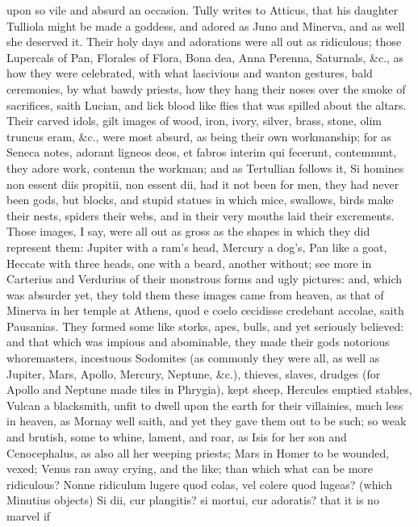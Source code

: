 {upon so vile and absurd an occasion. Tully writes to Atticus, that his
daughter Tulliola might be made a goddess, and adored as Juno and
Minerva, and as well she deserved it. Their holy days and adorations
were all out as ridiculous; those Lupercals of Pan, Florales of Flora,
Bona dea, Anna Perenna, Saturnals, \&c., as how they were celebrated,
with what lascivious and wanton gestures, bald ceremonies, by
what bawdy priests, how they hang their noses over the smoke of
sacrifices, saith Lucian, and lick blood like flies that was
spilled about the altars. Their carved idols, gilt images of wood,
iron, ivory, silver, brass, stone, olim truncus eram, \&c., were most
absurd, as being their own workmanship; for as Seneca notes, adorant
ligneos deos, et fabros interim qui fecerunt, contemnunt, they adore
work, contemn the workman; and as Tertullian follows it, Si homines non
essent diis propitii, non essent dii, had it not been for men, they had
never been gods, but blocks, and stupid statues in which mice,
swallows, birds make their nests, spiders their webs, and in their very
mouths laid their excrements. Those images, I say, were all out as
gross as the shapes in which they did represent them: Jupiter with a
ram's head, Mercury a dog's, Pan like a goat, Heccate with three heads,
one with a beard, another without; see more in Carterius and
Verdurius of their monstrous forms and ugly pictures: and, which
was absurder yet, they told them these images came from heaven, as that
of Minerva in her temple at Athens, quod e coelo cecidisse credebant
accolae, saith Pausanias. They formed some like storks, apes, bulls,
and yet seriously believed: and that which was impious and abominable,
they made their gods notorious whoremasters, incestuous Sodomites (as
commonly they were all, as well as Jupiter, Mars, Apollo, Mercury,
Neptune, \&c.), thieves, slaves, drudges (for Apollo and Neptune made
tiles in Phrygia), kept sheep, Hercules emptied stables, Vulcan a
blacksmith, unfit to dwell upon the earth for their villainies, much
less in heaven, as Mornay well saith, and yet they gave them out
to be such; so weak and brutish, some to whine, lament, and roar, as
Isis for her son and Cenocephalus, as also all her weeping priests;
Mars in Homer to be wounded, vexed; Venus ran away crying, and the
like; than which what can be more ridiculous? Nonne ridiculum lugere
quod colas, vel colere quod lugeas? (which Minutius objects) Si
dii, cur plangitis? si mortui, cur adoratis? that it is no marvel if
}
